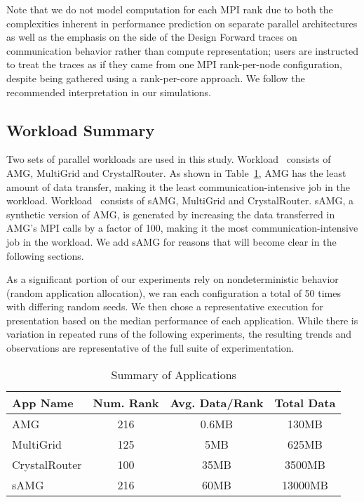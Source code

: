 Note that we do not model computation for each MPI rank due to both the complexities inherent in performance prediction on separate parallel architectures as well as the emphasis on the side of the Design Forward traces on communication behavior rather than compute representation; users are instructed to treat the traces as if they came from one MPI rank-per-node configuration, despite being gathered using a rank-per-core approach. We follow the recommended interpretation in our simulations. 

\subsection{Workload Summary}
\label{sec:workload summary}

Two sets of parallel workloads are used in this study. Workload~ consists of AMG, MultiGrid and CrystalRouter. As shown in Table~\ref{tab:apps-detail}, AMG has the least amount of data transfer, making it the least communication-intensive job in the workload. Workload~ consists of sAMG, MultiGrid and CrystalRouter. sAMG, a synthetic version of AMG, is generated by increasing the data transferred in AMG's MPI calls by a factor of 100, making it the most communication-intensive job in the workload. We add sAMG for reasons that will become clear in the following sections.

As a significant portion of our experiments rely on nondeterministic behavior (random application allocation), we ran each configuration a total of 50 times with differing random seeds. We then chose a representative execution for presentation based on the median performance of each application. While there is variation in repeated runs of the following experiments, the resulting trends and observations are representative of the full suite of experimentation.

\begin{table}[ht]
\begin{center}
\caption{Summary of Applications}
\label{tab:apps-detail}
\begin{tabular}{l c c c }
\toprule %
\toprule
App Name & Num. Rank & Avg. Data/Rank & Total Data\\ %
\midrule %
AMG  &    216 &   0.6MB   &     130MB\\ %
\midrule
MultiGrid  &    125 &   5MB   &     625MB\\ 
\midrule
CrystalRouter  &   100  &  35MB    &     3500MB\\ 
\midrule
sAMG  &    216 &   60MB   &     13000MB\\ %
\midrule %
\bottomrule %
\end{tabular}
\end{center}
\end{table}


